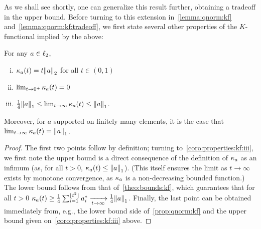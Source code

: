 As we shall see shortly, one can generalize this result further, obtaining a tradeoff in the upper bound. Before turning to this extension in~\cref{lemma:qnorm:kf} and~\cref{lemma:qnorm:kf:tradeoff}, we first state several other properties of the $K$-functional implied by the above:
\begin{corollary}\label{coro:properties:kf}
For any $a\in\lp[2]$,
\begin{enumerate}[(i)]
  \item $\kf{a}(t) = t\normtwo{a}$ for all $t\in(0,1)$
  \item $\lim_{t\to0^+} \kf{a}(t) = 0$
  \item\label{coro:properties:kf:iii} $\frac{1}{4} \normone{a} \leq \lim_{t\to\infty} \kf{a}(t) \leq \normone{a}$.
\end{enumerate}
Moreover, for $a$ supported on finitely many elements, it is the case that $\lim_{t\to\infty} \kf{a}(t) = \normone{a}$.
\end{corollary}
\begin{proof}
The first two points follow by definition; turning to~\cref{coro:properties:kf:iii}, we first note the upper bound is a direct consequence of the definition of $\kf{a}$ as an infimum (as, for all $t>0$, $\kf{a}(t)\leq \normone{a}$). (This itself ensures the limit as $t\to\infty$ exists by monotone convergence, as $\kf{a}$ is a non-decreasing bounded function.) The lower bound follows from that of~\cref{theo:bounds:kf}, which guarantees that for all $t>0$ $\kf{a}(t)\geq \frac{1}{4}\sum_{i=1}^{\lfloor{t^2}\rfloor} a_i^\ast \xrightarrow[t\to\infty]{} \frac{1}{4}\normone{a}$. Finally, the last point  can be obtained immediately from, e.g., the lower bound side of~\cref{prop:qnorm:kf} and the upper bound given on~\cref{coro:properties:kf:iii}  above.
\end{proof}

